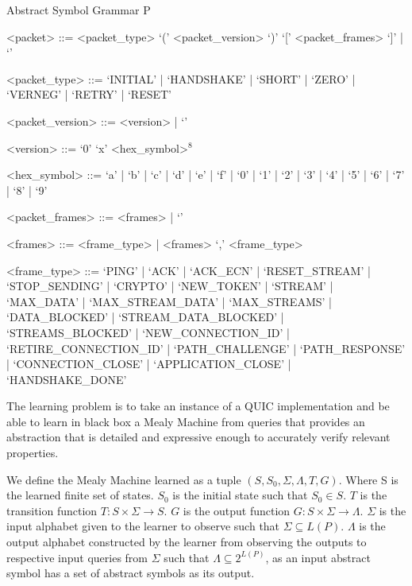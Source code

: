 \begin{definition}{Abstract Symbol Grammar P}
\begin{grammar}
<packet> ::= <packet_type> `(' <packet_version> `)' `[' <packet_frames> `]' | `'

<packet_type> ::= `INITIAL' | `HANDSHAKE' | `SHORT' | `ZERO' | `VERNEG' | `RETRY' | `RESET'

<packet_version> ::= <version> | `'

<version> ::= `0' `x' <hex_symbol>$^8$

<hex_symbol> ::= `a' | `b' | `c' | `d' | `e' | `f' | `0' | `1' | `2' | `3' | `4' | `5' | `6' | `7' | `8' | `9'

<packet_frames> ::= <frames> | `'

<frames> ::= <frame_type> | <frames> `,' <frame_type>

<frame_type> ::= `PING' | `ACK' | `ACK_ECN' | `RESET_STREAM' | `STOP_SENDING' | `CRYPTO' | `NEW_TOKEN' | \linebreak
`STREAM' | `MAX_DATA' | `MAX_STREAM_DATA' | `MAX_STREAMS' | \linebreak
`DATA_BLOCKED' | `STREAM_DATA_BLOCKED' | `STREAMS_BLOCKED' | `NEW_CONNECTION_ID' | \linebreak
`RETIRE_CONNECTION_ID' | `PATH_CHALLENGE' | `PATH_RESPONSE' | `CONNECTION_CLOSE' | \linebreak
`APPLICATION_CLOSE' | `HANDSHAKE_DONE'

\end{grammar}
\end{definition}

\begin{definition}
The learning problem is to take an instance of a QUIC implementation and be able to learn in black box a Mealy Machine from queries that provides an abstraction that is detailed and expressive enough to accurately verify relevant properties.

We define the Mealy Machine learned as a tuple $(S, S_0, \Sigma, \Lambda, T, G)$. 
Where S is the learned finite set of states. 
$S_0$ is the initial state such that $S_0 \in S$.
$T$ is the transition function $T \colon S \times \Sigma \to S$.
$G$ is the output function $G \colon S \times \Sigma \to \Lambda$.
$\Sigma$ is the input alphabet given to the learner to observe such that $\Sigma \subseteq L(P)$. 
$\Lambda$ is the output alphabet constructed by the learner from observing the outputs to respective input queries from $\Sigma$ such that $\Lambda \subseteq 2^{L(P)}$, as an input abstract symbol has a set of abstract symbols as its output.
\end{definition}

